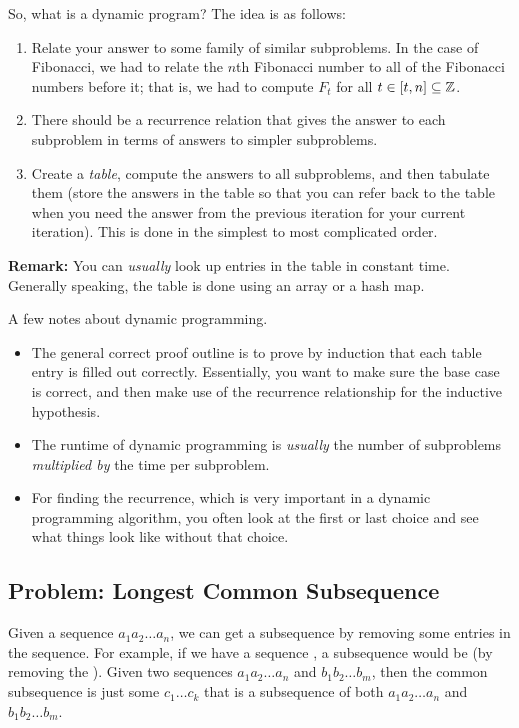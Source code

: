 \documentclass[letterpaper]{article}
\begin{document}
\bigskip 

So, what is a dynamic program? The idea is as follows: 
\begin{enumerate}
    \item Relate your answer to some family of similar subproblems. In the case of Fibonacci, we had to relate the $n$th Fibonacci number to all of the Fibonacci numbers before it; that is, we had to compute $F_t$ for all $t \in [t, n] \subseteq \mathbb{Z}$.
    \item There should be a recurrence relation that gives the answer to each subproblem in terms of answers to simpler subproblems. 
    \item Create a \emph{table}, compute the answers to all subproblems, and then tabulate them (store the answers in the table so that you can refer back to the table when you need the answer from the previous iteration for your current iteration). This is done in the simplest to most complicated order. 
\end{enumerate}
\textbf{Remark:} You can \emph{usually} look up entries in the table in constant time. Generally speaking, the table is done using an array or a hash map. 

\bigskip 

A few notes about dynamic programming. 
\begin{itemize}
    \item The general correct proof outline is to prove by induction that each table entry is filled out correctly. Essentially, you want to make sure the base case is correct, and then make use of the recurrence relationship for the inductive hypothesis.
    \item The runtime of dynamic programming is \emph{usually} the number of subproblems \emph{multiplied by} the time per subproblem. 
    \item For finding the recurrence, which is very important in a dynamic programming algorithm, you often look at the first or last choice and see what things look like without that choice.
\end{itemize}


\subsection{Problem: Longest Common Subsequence}
Given a sequence $a_1 a_2 \dots a_n$, we can get a subsequence by removing some entries in the sequence. For example, if we have a sequence , a subsequence would be  (by removing the ). Given two sequences $a_1 a_2 \dots a_n$ and $b_1 b_2 \dots b_m$, then the common subsequence is just some $c_1 \dots c_k$ that is a subsequence of both $a_1 a_2 \dots a_n$ and $b_1 b_2 \dots b_m$. 
\end{document}
